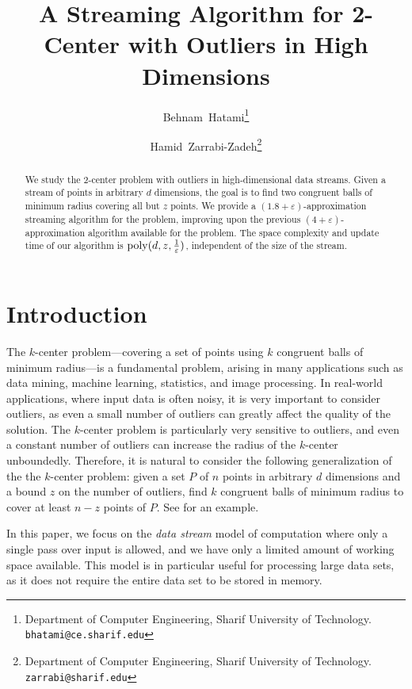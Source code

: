\documentclass[envcountsame]{cls/cccg15}
\title{A Streaming Algorithm for 2-Center with Outliers in High Dimensions}
\author{Behnam~Hatami\thanks{Department of Computer Engineering, 
	Sharif University of Technology.
	{\tt bhatami@ce.sharif.edu}}
	\and 
	Hamid~Zarrabi-Zadeh\thanks{Department of Computer Engineering, 
	Sharif University of Technology.
	{\tt zarrabi@sharif.edu}}
}
\newcommand{\poly}{\mathop{\mathrm{poly}}}
\newcommand{\eps}{\varepsilon}
\begin{document}
\maketitle
\pagestyle{plain}


\begin{abstract}
We study the 2-center problem with outliers in high-dimensional data streams. 
Given a stream of points in arbitrary $d$ dimensions, the goal is to find two congruent balls 
of minimum radius covering all but $z$ points. 
We provide a $(1.8+\eps)$-approximation streaming algorithm for the problem, 
improving upon the previous $(4 + \eps)$-approximation algorithm available for the problem.
The space complexity and update time of our algorithm is $\poly(d, z, {1 \over \eps})$,
independent of the size of the stream.
\end{abstract}


\section{Introduction}
The $k$-center problem---covering a set of points 
using $k$ congruent balls of minimum radius---is a fundamental problem,
arising in many applications 
such as data mining, machine learning, statistics, and image processing.
In real-world applications, where input data is often noisy, 
it is very important to consider outliers, 
as even a small number of outliers can greatly affect the quality of the solution.
The $k$-center problem is particularly very sensitive to outliers,
and even a constant number of outliers can increase the radius of the $k$-center unboundedly.
Therefore, it is natural to consider the following generalization of
the the $k$-center problem: %
given a set $P$ of $n$ points in arbitrary $d$ dimensions
and a bound $z$ on the number of outliers,
find $k$ congruent balls of minimum radius 
to cover at least $n - z$ points of $P$.
See  for an example.

In this paper, we focus on the \emph{data stream} model of computation
where only a single pass over input is allowed,
and we have only a limited amount of working space available.
This model is in particular useful for processing large data sets,
as it does not require the entire data set to be stored in memory.
\end{document}
